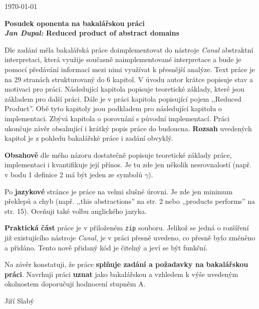 \documentclass{article}
\begin{document}
\begin{flushright}
\today
\end{flushright}
\begin{center}
\Large\textbf{Posudek oponenta na bakalářskou práci \\
\normalsize%
\textit{Jan Dupal:} Reduced product of abstract domains}
\end{center}

Dle zadání měla bakalářská práce doimplementovat do nástroje \emph{Canal}
abstraktní interpretaci, která využije současně naimplementované interpretace
a bude je pomocí předávání informací mezi nimi využívat k přesnější analýze.
Text práce je na 29 stranách strukturovaný do 6 kapitol. V úvodu autor krátce
popisuje stav a motivaci pro práci. Následující kapitola popisuje teoretické
základy, které jsou základem pro další práci. Dále je v práci kapitola
popisující pojem ,,Reduced Product''. Obě tyto kapitoly jsou podkladem pro
následující kapitolu o implementaci. Zbývá kapitola o porovnání s původní
implementací. Práci ukončuje závěr obsahující i krátký popis práce do
budoucna.  \textbf{Rozsah} uvedených kapitol je z pohledu bakalářské práce i
zadání obvyklý.

\textbf{Obsahově} dle mého názoru dostatečně popisuje teoretické základy
práce, implementaci i kvantifikuje její přínos. Je tu zde jen několik
nesrovnalostí (např.  v bodu 1 definice 2 má být jeden ze symbolů $\gamma$).

Po \textbf{jazykové} stránce je práce na velmi slušné úrovni. Je zde jen
minimum překlepů a chyb (např. ,,this abstractions'' na str. 2 nebo ,,products
performs'' na str. 15). Oceňuji také volbu anglického jazyka.

\textbf{Praktická část} práce je v přiloženém \texttt{zip} souboru. Jelikož se
jedná o rozšíření již existujícího nástroje \emph{Canal}, je v práci přesně
uvedeno, co přesně bylo změněno a přidáno. Tento nově přidaný kód je čitelný a
jeví se být funkční.

Na závěr konstatuji, že práce \textbf{splňuje zadání a požadavky na
bakalářskou práci}. Navrhuji práci \textbf{uznat} jako bakalářskou a vzhledem
k výše uvedeným okolnostem doporučuji hodnocení stupněm A.

\vspace{3em}
\begin{flushright}
Jiří Slabý
\end{flushright}
\end{document}
